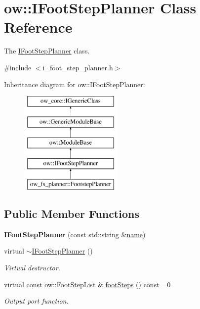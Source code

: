 \hypertarget{classow_1_1IFootStepPlanner}{}\section{ow\+:\+:I\+Foot\+Step\+Planner Class Reference}
\label{classow_1_1IFootStepPlanner}


The \hyperlink{classow_1_1IFootStepPlanner}{I\+Foot\+Step\+Planner} class.  




{\ttfamily \#include $<$i\+\_\+foot\+\_\+step\+\_\+planner.\+h$>$}

Inheritance diagram for ow\+:\+:I\+Foot\+Step\+Planner\+:\begin{figure}[H]
\begin{center}
\leavevmode
\includegraphics[height=5.000000cm]{db/de5/classow_1_1IFootStepPlanner}
\end{center}
\end{figure}
\subsection*{Public Member Functions}
\begin{DoxyCompactItemize}
\item 
{\bfseries I\+Foot\+Step\+Planner} (const std\+::string \&\hyperlink{classow_1_1GenericModuleBase_a4b712883728cdbab7779e27f9a23689c}{name})\hypertarget{classow_1_1IFootStepPlanner_afaeacd3f1203a5e6470add80e650b73f}{}\label{classow_1_1IFootStepPlanner_afaeacd3f1203a5e6470add80e650b73f}

\item 
virtual \hyperlink{classow_1_1IFootStepPlanner_a26c9382a46063f7896a9a89f062eef45}{$\sim$\+I\+Foot\+Step\+Planner} ()\hypertarget{classow_1_1IFootStepPlanner_a26c9382a46063f7896a9a89f062eef45}{}\label{classow_1_1IFootStepPlanner_a26c9382a46063f7896a9a89f062eef45}

\begin{DoxyCompactList}\small\item\em Virtual destructor. \end{DoxyCompactList}\item 
virtual const ow\+::\+Foot\+Step\+List \& \hyperlink{classow_1_1IFootStepPlanner_a8debb904fb67d2a8dbe14f1fea08ba25}{foot\+Steps} () const =0
\begin{DoxyCompactList}\small\item\em Output port function. \end{DoxyCompactList}\end{DoxyCompactItemize}
